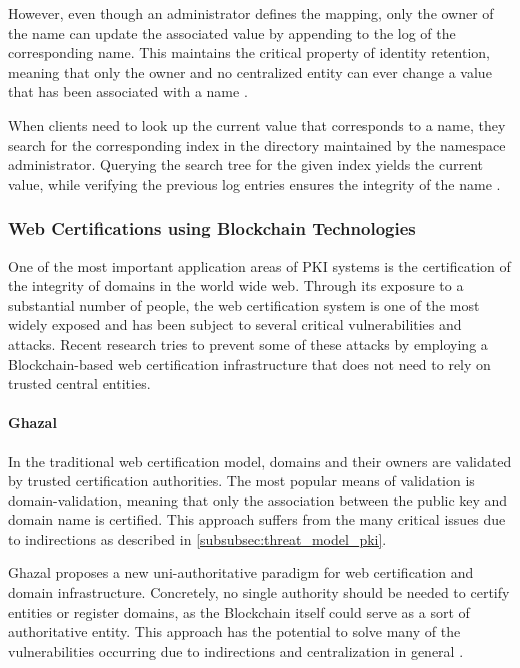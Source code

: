 However, even though an administrator defines the mapping, only the owner of the name can update the associated value by appending to the log of the corresponding name. This maintains the critical property of identity retention, meaning that only the owner and no centralized entity can ever change a value that has been associated with a name \cite{dong_bitforest:_2018}.

When clients need to look up the current value that corresponds to a name, they search for the corresponding index in the directory maintained by the namespace administrator. Querying the search tree for the given index yields the current value, while verifying the previous log entries ensures the integrity of the name \cite{dong_bitforest:_2018}.


\subsubsection{Web Certifications using Blockchain Technologies}

One of the most important application areas of PKI systems is the certification of the integrity of domains in the world wide web. Through its exposure to a substantial number of people, the web certification system is one of the most widely exposed and has been subject to several critical vulnerabilities and attacks. Recent research tries to prevent some of these attacks by employing a Blockchain-based web certification infrastructure that does not need to rely on trusted central entities.

\paragraph{Ghazal}

In the traditional web certification model, domains and their owners are validated by trusted certification authorities. The most popular means of validation is domain-validation, meaning that only the association between the public key and domain name is certified. This approach suffers from the many critical issues due to indirections as described in \ref{subsubsec:threat_model_pki}.

Ghazal proposes a new uni-authoritative paradigm for web certification and domain infrastructure. Concretely, no single authority should be needed to certify entities or register domains, as the Blockchain itself could serve as a sort of authoritative entity. This approach has the potential to solve many of the vulnerabilities occurring due to indirections and centralization in general \cite{zohar_ghazal:_2019}.

